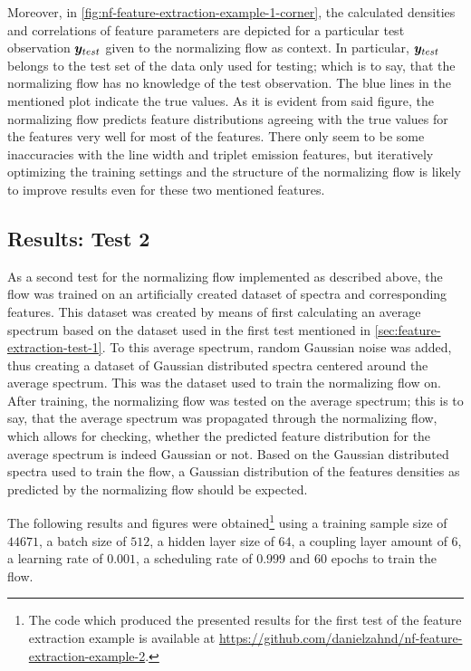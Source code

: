\documentclass[a4paper,12pt]{report}
\begin{document}
Moreover, in \cref{fig:nf-feature-extraction-example-1-corner}, the calculated densities and correlations of feature parameters are depicted for a particular test observation $\bm{y}_{test}$ given to the normalizing flow as context. In particular, $\bm{y}_{test}$ belongs to the test set of the data only used for testing; which is to say, that the normalizing flow has no knowledge of the test observation. The blue lines in the mentioned plot indicate the true values. As it is evident from said figure, the normalizing flow predicts feature distributions agreeing with the true values for the features very well for most of the features. There only seem to be some inaccuracies with the line width and triplet emission features, but iteratively optimizing the training settings and the structure of the normalizing flow is likely to improve results even for these two mentioned features.

\subsection{Results: Test 2}
As a second test for the normalizing flow implemented as described above, the flow was trained on an artificially created dataset of spectra and corresponding features. This dataset was created by means of first calculating an average spectrum based on the dataset used in the first test mentioned in \cref{sec:feature-extraction-test-1}. To this average spectrum, random Gaussian noise was added, thus creating a dataset of Gaussian distributed spectra centered around the average spectrum. This was the dataset used to train the normalizing flow on. After training, the normalizing flow was tested on the average spectrum; this is to say, that the average spectrum was propagated through the normalizing flow, which allows for checking, whether the predicted feature distribution for the average spectrum is indeed Gaussian or not. Based on the Gaussian distributed spectra used to train the flow, a Gaussian distribution of the features densities as predicted by the normalizing flow should be expected.

The following results and figures were obtained\footnote{The code which produced the presented results for the first test of the feature extraction example is available at \url{https://github.com/danielzahnd/nf-feature-extraction-example-2}.} using a training sample size of $44671$, a batch size of $512$, a hidden layer size of $64$, a coupling layer amount of $6$, a learning rate of $0.001$, a scheduling rate of $0.999$ and $60$ epochs to train the flow.
\end{document}

